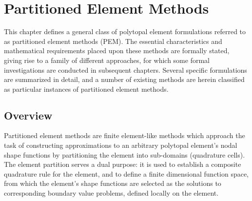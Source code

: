 \chapter{Partitioned Element Methods} \label{ch:pem}
%
This chapter defines a general class of polytopal element formulations referred to as partitioned element methods (PEM). The essential characteristics and mathematical requirements placed upon these methods are formally stated, giving rise to a family of different approaches, for which some formal investigations are conducted in subsequent chapters. Several specific formulations are summarized in detail, and a number of existing methods are herein classified as particular instances of partitioned element methods.

\section{Overview}


Partitioned element methods are finite element-like methods which approach the task of constructing approximations to an arbitrary polytopal element's nodal shape functions by partitioning the element into sub-domains (quadrature cells). The element partition serves a dual purpose: it is used to establish a composite quadrature rule for the element, and to define a finite dimensional function space, from which the element's shape functions are selected as the solutions to corresponding boundary value problems, defined locally on the element.

